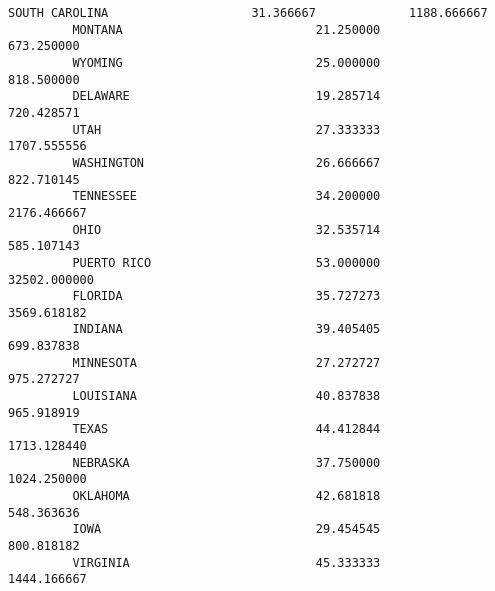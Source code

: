 \documentclass[11pt]{article}
\begin{document}
\begin{Verbatim}[commandchars=\\\{\}]
         SOUTH CAROLINA                    31.366667             1188.666667   
         MONTANA                           21.250000              673.250000   
         WYOMING                           25.000000              818.500000   
         DELAWARE                          19.285714              720.428571   
         UTAH                              27.333333             1707.555556   
         WASHINGTON                        26.666667              822.710145   
         TENNESSEE                         34.200000             2176.466667   
         OHIO                              32.535714              585.107143   
         PUERTO RICO                       53.000000            32502.000000   
         FLORIDA                           35.727273             3569.618182   
         INDIANA                           39.405405              699.837838   
         MINNESOTA                         27.272727              975.272727   
         LOUISIANA                         40.837838              965.918919   
         TEXAS                             44.412844             1713.128440   
         NEBRASKA                          37.750000             1024.250000   
         OKLAHOMA                          42.681818              548.363636   
         IOWA                              29.454545              800.818182   
         VIRGINIA                          45.333333             1444.166667   
         

\end{Verbatim}
\end{document}
